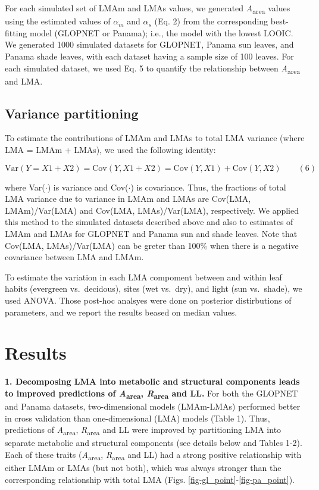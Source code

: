 \documentclass[
  12pt,
  letterpaper,
  DIV=11,
  numbers=noendperiod]{scrartcl}
\begin{document}
For each simulated set of LMAm and LMAs values, we generated
\emph{A}\textsubscript{area} values using the estimated values of
\(\alpha_m\) and \(\alpha_s\) (Eq. 2) from the corresponding
best-fitting model (GLOPNET or Panama); i.e., the model with the lowest
LOOIC. We generated 1000 simulated datasets for GLOPNET, Panama sun
leaves, and Panama shade leaves, with each dataset having a sample size
of 100 leaves. For each simulated dataset, we used Eq. 5 to quantify the
relationship between \emph{A}\textsubscript{area} and LMA.

\hypertarget{variance-partitioning}{%
\subsection{Variance partitioning}\label{variance-partitioning}}

To estimate the contributions of LMAm and LMAs to total LMA variance
(where LMA = LMAm + LMAs), we used the following identity:

\[
\mathrm{Var}(Y = X1 + X2) = \mathrm{Cov}(Y, X1+X2) = \mathrm{Cov}(Y,X1) + \mathrm{Cov}(Y,X2) \qquad(6)
\]

where Var(\(\cdot\)) is variance and Cov(\(\cdot\)) is covariance. Thus,
the fractions of total LMA variance due to variance in LMAm and LMAs are
Cov(LMA, LMAm)/Var(LMA) and Cov(LMA, LMAs)/Var(LMA), respectively. We
applied this method to the simulated datasets described above and also
to estimates of LMAm and LMAs for GLOPNET and Panama sun and shade
leaves. Note that Cov(LMA, LMAs)/Var(LMA) can be greter than 100\% when
there is a negative covariance between LMA and LMAm.

To estimate the variation in each LMA compoment between and within leaf
habits (evergreen vs.~decidous), sites (wet vs.~dry), and light (sun
vs.~shade), we used ANOVA. Those post-hoc analsyes were done on
posterior distirbutions of parameters, and we report the results beased
on median values.

\hypertarget{results}{%
\section{Results}\label{results}}

\textbf{1. Decomposing LMA into metabolic and structural components
leads to improved predictions of \emph{A}\textsubscript{area},
\emph{R}\textsubscript{area} and LL.} For both the GLOPNET and Panama
datasets, two-dimensional models (LMAm-LMAs) performed better in cross
validation than one-dimensional (LMA) models (Table 1). Thus,
predictions of \emph{A}\textsubscript{area},
\emph{R}\textsubscript{area} and LL were improved by partitioning LMA
into separate metabolic and structural components (see details below and
Tables 1-2). Each of these traits (\emph{A}\textsubscript{area},
\emph{R}\textsubscript{area} and LL) had a strong positive relationship
with either LMAm or LMAs (but not both), which was always stronger than
the corresponding relationship with total LMA (Figs.
\ref{fig-gl_point}-\ref{fig-pa_point}).
\end{document}
